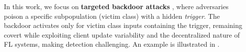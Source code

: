 In this work, we focus on \textbf{targeted backdoor attacks} \citep{targeted_backdoors}, where adversaries poison a specific subpopulation (victim class) with a hidden \emph{trigger}. The backdoor activates only for victim class inputs containing the trigger, remaining covert while exploiting client update variability and the decentralized nature of FL systems, making detection challenging. An example is illustrated in .